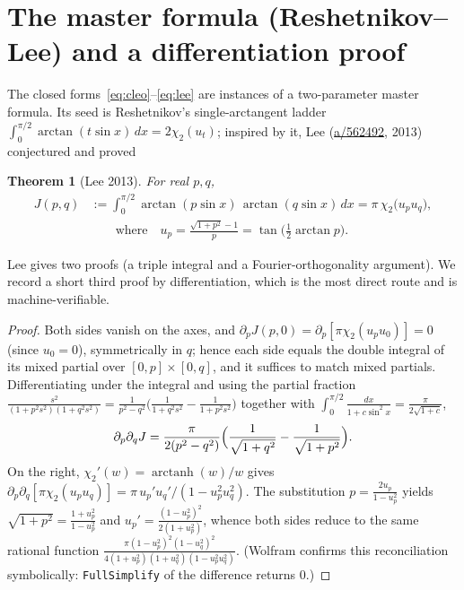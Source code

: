 \documentclass[11pt]{article}
\DeclareMathOperator{\arctanh}{arctanh}
\newcommand{\chitwo}{\chi_{2}}
\newcommand{\up}{u_{p}}
\newcommand{\uq}{u_{q}}
\theoremstyle{plain}\newtheorem{theorem}{Theorem}\newtheorem{proposition}[theorem]{Proposition}
\theoremstyle{remark}\newtheorem{remark}[theorem]{Remark}
\begin{document}
\section{The master formula (Reshetnikov--Lee) and a differentiation proof}
The closed forms~\eqref{eq:cleo}--\eqref{eq:lee} are instances of a two-parameter master formula. Its
seed is Reshetnikov's single-arctangent ladder
$\int_0^{\pi/2}\arctan(t\sin x)\,dx=2\chitwo(u_t)$; inspired by it, Lee
(\href{https://math.stackexchange.com/a/562492}{a/562492}, 2013) conjectured and proved
\begin{theorem}[Lee 2013]\label{thm:master}
For real $p,q$,
\begin{equation}\label{eq:master}
\begin{aligned}
  J(p,q)&:=\int_0^{\pi/2}\arctan(p\sin x)\,\arctan(q\sin x)\,dx=\pi\,\chitwo\!\bigl(\up\uq\bigr),\\
  &\qquad\text{where}\quad\up=\frac{\sqrt{1+p^2}-1}{p}=\tan\!\bigl(\tfrac12\arctan p\bigr).
\end{aligned}
\end{equation}
\end{theorem}
Lee gives two proofs (a triple integral and a Fourier-orthogonality argument). We record a short third
proof by differentiation, which is the most direct route and is machine-verifiable.
\begin{proof}
Both sides vanish on the axes, and $\partial_pJ(p,0)=\partial_p[\pi\chitwo(\up u_0)]=0$ (since $u_0=0$),
symmetrically in $q$; hence each side equals the double integral of its mixed partial over
$[0,p]\times[0,q]$, and it suffices to match mixed partials. Differentiating under the integral and using
the partial fraction $\frac{s^2}{(1+p^2s^2)(1+q^2s^2)}=\frac{1}{p^2-q^2}\bigl(\frac1{1+q^2s^2}-\frac1{1+p^2s^2}\bigr)$
together with $\int_0^{\pi/2}\frac{dx}{1+c\sin^2x}=\frac{\pi}{2\sqrt{1+c}}$,
\begin{equation}\label{eq:lhsmixed}
  \partial_p\partial_q J=\frac{\pi}{2(p^2-q^2)}\Bigl(\frac{1}{\sqrt{1+q^2}}-\frac{1}{\sqrt{1+p^2}}\Bigr).
\end{equation}
On the right, $\chitwo'(w)=\arctanh(w)/w$ gives
$\partial_p\partial_q[\pi\chitwo(\up\uq)]=\pi\,\up'\uq'/(1-\up^2\uq^2)$. The substitution
$p=\frac{2\up}{1-\up^2}$ yields $\sqrt{1+p^2}=\frac{1+\up^2}{1-\up^2}$ and $\up'=\frac{(1-\up^2)^2}{2(1+\up^2)}$,
whence both sides reduce to the same rational function
$\frac{\pi(1-\up^2)^2(1-\uq^2)^2}{4(1+\up^2)(1+\uq^2)(1-\up^2\uq^2)}$. (Wolfram confirms this reconciliation
symbolically: \texttt{FullSimplify} of the difference returns $0$.)
\end{proof}
\end{document}
